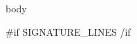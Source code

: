 \documentclass{letter}
\begin{document}
\opening{}

{{{body}}}

{{#if SIGNATURE_LINES}}
\signaturelines
{{/if}}
\end{document}

